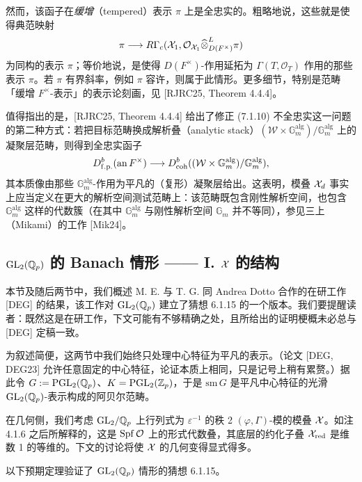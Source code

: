 
然而，该函子在\emph{缓增}（tempered）表示 $\pi$ 上是全忠实的。粗略地说，这些就是使得典范映射
\[
\pi\longrightarrow R\Gamma_c(\mathcal X_1,\mathcal O_{\mathcal X_1}\widehat\otimes^{L}_{D(F^\times)}\pi)
\]
为同构的表示 $\pi$；等价地说，是使得 $D(F^\times)$-作用延拓为 $\Gamma(T,\mathcal O_T)$ 作用的那些表示 $\pi$。若 $\pi$ 有界斜率，例如 $\pi$ 容许，则属于此情形。更多细节，特别是范畴「缓增 $F^\times$-表示」的表示论刻画，见 [RJRC25, Theorem 4.4.4]。

值得指出的是，[RJRC25, Theorem 4.4.4] 给出了修正 (7.1.10) 不全忠实这一问题的第二种方式：若把目标范畴换成解析叠（analytic stack）$(\mathcal W\times\mathbb G_m^{\mathrm{alg}})/\mathbb G_m^{\mathrm{alg}}$ 上的凝聚层范畴，则得到全忠实函子
\[
D^b_{\mathrm{f.p.}}(\mathrm{an}\,F^\times)\longrightarrow D^b_{\mathrm{coh}}((\mathcal W\times\mathbb G_m^{\mathrm{alg}})/\mathbb G_m^{\mathrm{alg}}),
\]
其本质像由那些 $\mathbb G_m^{\mathrm{alg}}$-作用为平凡的（复形）凝聚层给出。这表明，模叠 $\mathcal{X}_d$ 事实上应当定义在更大的解析空间测试范畴上：该范畴既包含刚性解析空间，也包含 $\mathbb G_m^{\mathrm{alg}}$ 这样的代数簇（在其中 $\mathbb G_m^{\mathrm{alg}}$ 与刚性解析空间 $\mathbb G_m$ 并不等同），参见三上（Mikami）的工作 [Mik24]。

\subsection{$\mathrm{GL}_2(\mathbb{Q}_p)$ 的 Banach 情形 —— I. $\mathcal{X}$ 的结构}

本节及随后两节中，我们概述 M. E. 与 T. G. 同 Andrea Dotto 合作的在研工作 [DEG] 的结果，该工作对 $\mathrm{GL}_2(\mathbb{Q}_p)$ 建立了猜想 6.1.15 的一个版本。我们要提醒读者：既然这是在研工作，下文可能有不够精确之处，且所给出的证明梗概未必总与 [DEG] 定稿一致。

为叙述简便，这两节中我们始终只处理中心特征为平凡的表示。（论文 [DEG, DEG23] 允许任意固定的中心特征，论证本质上相同，只是记号上稍有累赘。）据此令 $G:=\mathrm{PGL}_2(\mathbb{Q}_p)$、$K=\mathrm{PGL}_2(\mathbb{Z}_p)$，于是 $\mathrm{sm}\,G$ 是平凡中心特征的光滑 $\mathrm{GL}_2(\mathbb{Q}_p)$-表示构成的阿贝尔范畴。

在几何侧，我们考虑 $\mathrm{GL}_2/\mathbb{Q}_p$ 上行列式为 $\varepsilon^{-1}$ 的秩 2 $(\varphi,\Gamma)$-模的模叠 $\mathcal{X}$。如注 4.1.6 之后所解释的，这是 $\operatorname{Spf}\mathcal O$ 上的形式代数叠，其底层的约化子叠 $\mathcal{X}_{\mathrm{red}}$ 是维数 1 的等维的。下文的讨论将使 $\mathcal{X}$ 的几何变得显式得多。

以下预期定理验证了 $\mathrm{GL}_2(\mathbb{Q}_p)$ 情形的猜想 6.1.15。


